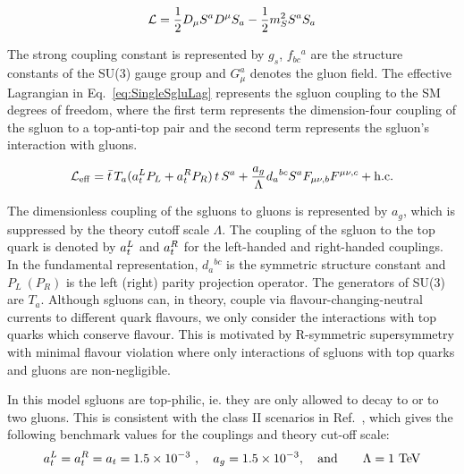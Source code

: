 \begin{equation}
 {\cal L}= \frac{1}{2}D_{\mu}S^aD^{\mu} S_a
          -\frac{1}{2}m_S^2 S^a S_a
          \label{eqn:sgluonLag}
\end{equation}



The strong coupling constant is represented by $g_s$, $f_{bc}{}^a$ are the structure
constants of the SU(3) gauge group and $G_\mu^a$ denotes the gluon field.
The effective Lagrangian in Eq.~\ref{eq:SingleSgluLag} represents the sgluon coupling to the SM degrees of freedom, where the first term represents the dimension-four coupling of the sgluon to a top-anti-top pair and the second term represents the sgluon's interaction with gluons.

\begin{equation}
 {\cal L}_{\rm eff}= \bar t\, T_a (a_t^L P_L + a_t^R P_R)\, t\, S^a
 +\frac{a_g}{\Lambda} d_a{}^{bc} S^a F_{\mu\nu, b} F^{\mu\nu, c}
 + {\rm h.c.} 
\label{eq:SingleSgluLag}\end{equation}

The dimensionless coupling of the sgluons to gluons is represented by ${a_g}$, which is suppressed by the theory cutoff scale $\Lambda$. The coupling of the sgluon to the top quark is denoted by $a_t^L$ and  $a_t^R$ for the left-handed and right-handed couplings. In the fundamental representation, $d_a{}^{bc}$ is the symmetric structure constant and $P_{L}~(P_{R})$ is the left (right) parity projection operator. The generators of SU(3) are $T_a$.
Although sgluons can, in theory, couple via flavour-changing-neutral currents to different quark flavours, we only consider the interactions with top quarks which conserve flavour. This is motivated by R-symmetric supersymmetry with minimal flavour violation where only interactions of sgluons with top quarks and gluons are non-negligible.

In this model sgluons are top-philic, ie. they are only allowed to decay to \ttbar or to two gluons. This is consistent with the class II scenarios in Ref.~\cite{Calvet:2012rk}, which gives the following benchmark values for the couplings and theory cut-off scale:
\begin{align}
 &a_t^L = a_t^R = a_t = 1.5\times 10^{-3}\ , \quad
 a_g = 1.5\times 10^{-3},\nonumber \quad\text{and}\quad&\Lambda = 1~{\rm TeV}
 \label{eq:benchmark}
\end{align}

